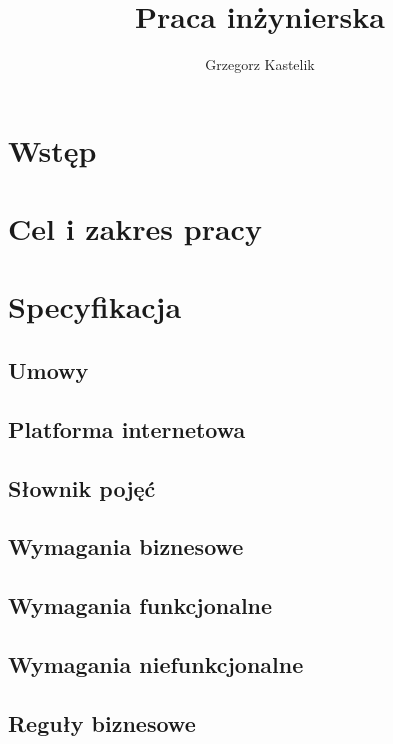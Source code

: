 \documentclass[12pt]{report}
\author{Grzegorz Kastelik}
\title{Praca inżynierska}
\begin{document}
    \maketitle
    \newpage
    \tableofcontents
    \chapter*{Wstęp}
        
    \chapter*{Cel i zakres pracy}
        
    \chapter{Specyfikacja}
        \section{Umowy}
            
        \section{Platforma internetowa}
            
        \section{Słownik pojęć}
            
        \section{Wymagania biznesowe}
            
        \section{Wymagania funkcjonalne}
            
        \section{Wymagania niefunkcjonalne}
            
        \section{Reguły biznesowe}
            
\end{document}
